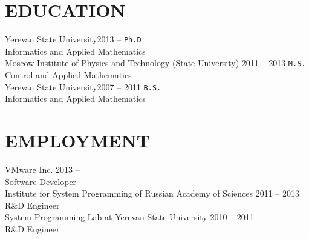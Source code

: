 \documentclass[10pt]{res}
\begin{document}
\begin{resume}


\section{EDUCATION}
\vspace{5pt}
	Yerevan State University\hfill 2013 --\phantom{ 2016} \quad \texttt{Ph.D} \\
	Informatics and Applied Mathematics \vspace{5pt} \\
	Moscow Institute of Physics and Technology (State University) \hfill 2011 -- 2013 \quad \texttt{M.S.}\\
	Control and Applied Mathematics \vspace{5pt} \\
	Yerevan State University\hfill 2007 -- 2011 \quad \texttt{B.S.}\\
	Informatics and Applied Mathematics

\section{EMPLOYMENT}
\vspace{5pt}
	VMware Inc. \hfill 2013 -- \latestjobyear \yearpostfix \\
	Software Developer \vspace{5pt} \\
	Institute for System Programming of Russian Academy of Sciences \hfill 2011 -- 2013 \yearpostfix \\%
	R\&D Engineer \vspace{5pt} \\
	System Programming Lab at Yerevan State University \hfill 2010 -- 2011 \yearpostfix \\
	R\&D Engineer


\end{resume}
\end{document}
